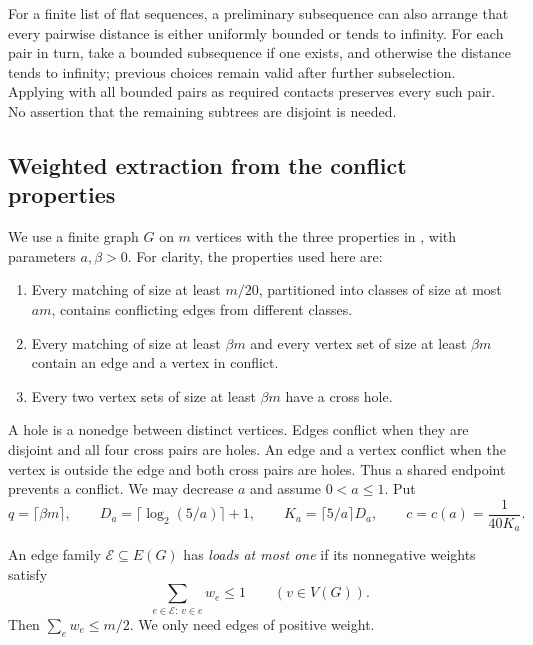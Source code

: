 For a finite list of flat sequences, a preliminary subsequence can
also arrange that every pairwise distance is either uniformly bounded
or tends to infinity.  For each pair in turn, take a bounded subsequence
if one exists, and otherwise the distance tends to infinity; previous
choices remain valid after further subselection.  Applying
 with all bounded pairs as required contacts
preserves every such pair.  No assertion that the remaining subtrees
are disjoint is needed.

\subsection{Weighted extraction from the conflict properties}

We use a finite graph \(G\) on \(m\) vertices with the three
properties in , with parameters \(a,\beta>0\).
For clarity, the properties used here are:
\begin{enumerate}[label=\textup{(\alph*)}]
\item\label{mt:property-colour}
Every matching of size at least \(m/20\), partitioned into classes
of size at most \(am\), contains conflicting edges from different
classes.
\item\label{mt:property-point}
Every matching of size at least \(\beta m\) and every vertex set of
size at least \(\beta m\) contain an edge and a vertex in conflict.
\item\label{mt:property-hole}
Every two vertex sets of size at least \(\beta m\) have a cross hole.
\end{enumerate}
A hole is a nonedge between distinct vertices.  Edges conflict when
they are disjoint and all four cross pairs are holes.  An edge and a
vertex conflict when the vertex is outside the edge and both cross
pairs are holes.  Thus a shared endpoint prevents a conflict.
We may decrease \(a\) and assume \(0<a\le1\).  Put
\begin{equation}\label{mt:constants}
 q=\lceil\beta m\rceil,\qquad
 D_a=\lceil\log_2(5/a)\rceil+1,\qquad
 K_a=\lceil5/a\rceil D_a,\qquad
 c=c(a)=\frac1{40K_a}.
\end{equation}

An edge family \(\mathcal E\subseteq E(G)\) has \emph{loads at most
one} if its nonnegative weights satisfy
\begin{equation}\label{mt:loads}
 \sum_{e\in\mathcal E:\,v\in e}w_e\le1
 \qquad(v\in V(G)).
\end{equation}
Then \(\sum_e w_e\le m/2\).  We only need edges of positive weight.

